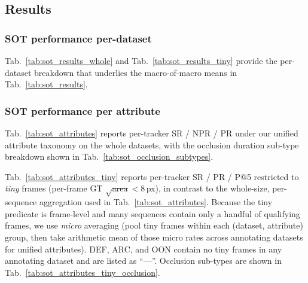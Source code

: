 \documentclass{article}
\begin{document}
\subsection{Results}
\subsubsection{SOT performance per-dataset}
Tab.~\ref{tab:sot_results_whole} and Tab.~\ref{tab:sot_results_tiny} provide the
per-dataset breakdown that underlies the macro-of-macro means in
Tab.~\ref{tab:sot_results}.




% 




\subsubsection{SOT performance per attribute}
Tab.~\ref{tab:sot_attributes} reports per-tracker SR / NPR / PR under our
unified attribute taxonomy on the whole datasets, with the occlusion
duration sub-type breakdown shown in Tab.~\ref{tab:sot_occlusion_subtypes}.



Tab.~\ref{tab:sot_attributes_tiny} reports per-tracker SR / PR / P@5 restricted
to \emph{tiny} frames (per-frame GT $\sqrt{\mathrm{area}} < 8$\,px), in contrast
to the whole-size, per-sequence aggregation used in
Tab.~\ref{tab:sot_attributes}. Because the tiny predicate is frame-level and
many sequences contain only a handful of qualifying frames, we use \emph{micro}
averaging (pool tiny frames within each (dataset, attribute) group, then take
arithmetic mean of those micro rates across annotating datasets for unified
attributes). DEF, ARC, and OON contain no tiny frames in any annotating dataset
and are listed as ``---''. Occlusion sub-types are shown in
Tab.~\ref{tab:sot_attributes_tiny_occlusion}.







\clearpage

\end{document}

